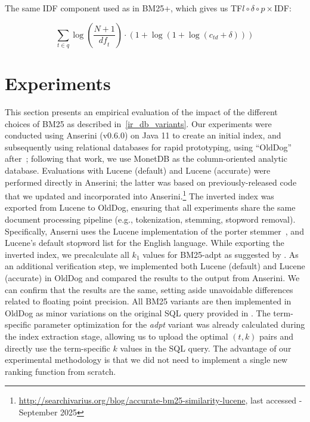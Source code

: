 The same IDF component used as in BM25+, which gives us TF$l\circ\delta\circ p\times$IDF: 

\begin{equation}
	\label{tf-ldp-idf}
	\sum_{t\in q}\log\left(\frac{N+1}{\mathit{df}_t}\right)\cdot\left(1+\log\left(1+\log\left(c_{\mathit{td}}+\delta\right)\right)\right)
\end{equation}

\section{Experiments}
This section presents an empirical evaluation of the impact of the different choices of BM25 as described in~\cref{ir_db_variants}.
Our experiments were conducted using Anserini (v0.6.0) on Java 11 to create an initial index, and subsequently using relational databases for rapid prototyping, using ``OldDog''~\citep{olddog-docker} after~\citet{OldDog}; following that work, we use MonetDB as the column-oriented analytic database. Evaluations with Lucene (default) and Lucene (accurate) were performed directly in Anserini; the latter was based on previously-released code that we updated and incorporated into Anserini.\footnote{\url{http://searchivarius.org/blog/accurate-bm25-similarity-lucene}, last accessed - September 2025} The inverted index was exported from Lucene to OldDog, ensuring that all experiments share the same document processing pipeline (e.g., tokenization, stemming, stopword removal). Specifically, Anserni uses the Lucene implementation of the porter stemmer~\citep{porter}, and Lucene's default stopword list for the English language. While exporting the inverted index, we precalculate all $k_1$ values for BM25-adpt as suggested by \citet{bm25-adpt}. As an additional verification step, we implemented both Lucene (default) and Lucene (accurate) in OldDog and compared the results to the output from Anserini. We can confirm that the results are the same, setting aside unavoidable differences related to floating point precision. All BM25 variants are then implemented in OldDog as minor variations on the original SQL query provided in \citet{OldDog}. The term-specific parameter optimization for the \emph{adpt} variant was already calculated during the index extraction stage, allowing us to upload the optimal $(t, k)$ pairs and directly use the term-specific $k$ values in the SQL query. The advantage of our experimental methodology is that we did not need to implement a single new ranking function from scratch.

